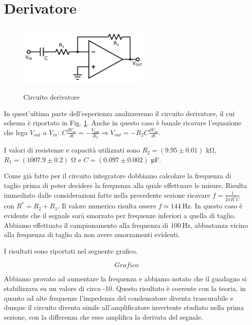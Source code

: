 \section{Derivatore}

\begin{figure}
	\caption{Circuito derivatore}
	\includegraphics[width=65mm]{ccder.pdf}
	\label{fig:ccder}
\end{figure}

In quest'ultima parte dell'esperienza analizzeremo il circuito derivatore, il cui schema è riportato in Fig. \ref{fig:ccder}.
Anche in questo caso è banale ricavare l'equazione che lega $V_{out}$ a $V_{in}$: $C\frac{dV_{in}}{dt}=-\frac{V_{out}}{R_2}\Rightarrow V_{out}=-R_2C\frac{dV_{in}}{dt}$.

I valori di resistenze e capacità utilizzati sono $R_2=(9.95 \pm 0.01)$ \si{\kilo\ohm}, $R_1=(1007.9 \pm 0.2)$ \si{\ohm} e $C=(0.097 \pm 0.002)$ \si{\micro\farad}.

Come già fatto per il circuito integratore dobbiamo calcolare la frequenza di taglio prima di poter decidere la frequenza alla quale effettuare le misure.
Risulta immediato dalle considerazioni fatte nella precedente sezione ricavare $f=\frac{1}{2 \pi R^* C}$ con $R^*=R_2+R_1$.
Il valore numerico risulta essere $f \simeq \SI{144}{\hertz}$.
In questo caso è evidente che il segnale sarà smorzato per frequenze inferiori a quella di taglio. Abbiamo effettuato il campionamento alla frequenza di $\SI{100}{\hertz}$, abbastanza vicino alla frequenza di taglio da non avere smorzamenti evidenti.

I risultati sono riportati nel seguente grafico.

$$Grafico$$

Abbiamo provato ad aumentare la frequenza e abbiamo notato che il guadagno si stabilizzava su un valore di circa -10.
Questo risultato è coerente con la teoria, in quanto ad alte frequenze l'impedenza del condensatore diventa trascurabile e dunque il circuito diventa simile all'amplificatore invertente studiato nella prima sezione, con la differenza che esso amplifica la derivata del segnale.